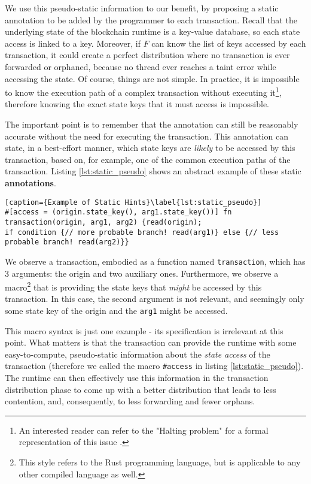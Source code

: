 We use this pseudo-static information to our benefit, by proposing a static annotation to be added
by the programmer to each transaction. Recall that the underlying state of the blockchain runtime is
a key-value database, so each state access is linked to a key. Moreover, if $F$ can know the list of
keys accessed by each transaction, it could create a perfect distribution where no transaction is
ever forwarded or orphaned, because no thread ever reaches a taint error while accessing the state.
Of course, things are not simple. In practice, it is impossible to know the execution path of a
complex transaction without executing it\footnote{An interested reader can refer to the "Halting
problem" for a formal representation of this issue \cite{burkholderHaltingProblem1987}.}, therefore
knowing the exact state keys that it must access is impossible.

The important point is to remember that the annotation can still be reasonably accurate without the
need for executing the transaction. This annotation can state, in a best-effort manner, which state
keys are \textit{likely} to be accessed by this transaction, based on, for example, one of the
common execution paths of the transaction. Listing \ref{lst:static_pseudo} shows an abstract example
of these static \textbf{annotations}.

\begin{lstlisting}[caption={Example of Static Hints}\label{lst:static_pseudo}]
#[access = (origin.state_key(), arg1.state_key())] fn transaction(origin, arg1, arg2) {read(origin);
if condition {// more probable branch! read(arg1)} else {// less probable branch! read(arg2)}}
\end{lstlisting}

We observe a transaction, embodied as a function named \texttt{transaction}, which has 3 arguments:
the origin and two auxiliary ones. Furthermore, we observe a macro\footnote{This style refers to the
Rust programming language, but is applicable to any other compiled language as well.} that is
providing the state keys that \textit{might} be accessed by this transaction. In this case, the
second argument is not relevant, and seemingly only some state key of the origin and the
\texttt{arg1} might be accessed.

This macro syntax is just one example - its specification is irrelevant at this point. What matters
is that the transaction can provide the runtime with some easy-to-compute, pseudo-static information
about the \textit{state access} of the transaction (therefore we called the macro \texttt{\#access}
in listing \ref{lst:static_pseudo}). The runtime can then effectively use this information in the
transaction distribution phase to come up with a better distribution that leads to less contention,
and, consequently, to less forwarding and fewer orphans.

